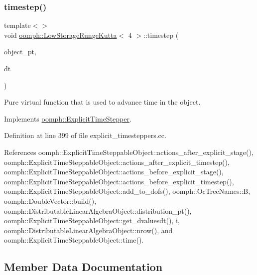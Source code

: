 \subsubsection{\texorpdfstring{timestep()}{timestep()}\hspace{0.1cm}{\footnotesize\ttfamily [2/2]}}
{\footnotesize\ttfamily template$<$$>$ \\
void \hyperlink{classoomph_1_1LowStorageRungeKutta}{oomph\+::\+Low\+Storage\+Runge\+Kutta}$<$ 4 $>$\+::timestep (\begin{DoxyParamCaption}\item[{\hyperlink{classoomph_1_1ExplicitTimeSteppableObject}{Explicit\+Time\+Steppable\+Object} $\ast$const \&}]{object\+\_\+pt,  }\item[{const double \&}]{dt }\end{DoxyParamCaption})\hspace{0.3cm}{\ttfamily [virtual]}}



Pure virtual function that is used to advance time in the object. 



Implements \hyperlink{classoomph_1_1ExplicitTimeStepper_ab43bbab17960d0f50b8842e996f5c765}{oomph\+::\+Explicit\+Time\+Stepper}.



Definition at line 399 of file explicit\+\_\+timesteppers.\+cc.



References oomph\+::\+Explicit\+Time\+Steppable\+Object\+::actions\+\_\+after\+\_\+explicit\+\_\+stage(), oomph\+::\+Explicit\+Time\+Steppable\+Object\+::actions\+\_\+after\+\_\+explicit\+\_\+timestep(), oomph\+::\+Explicit\+Time\+Steppable\+Object\+::actions\+\_\+before\+\_\+explicit\+\_\+stage(), oomph\+::\+Explicit\+Time\+Steppable\+Object\+::actions\+\_\+before\+\_\+explicit\+\_\+timestep(), oomph\+::\+Explicit\+Time\+Steppable\+Object\+::add\+\_\+to\+\_\+dofs(), oomph\+::\+Oc\+Tree\+Names\+::B, oomph\+::\+Double\+Vector\+::build(), oomph\+::\+Distributable\+Linear\+Algebra\+Object\+::distribution\+\_\+pt(), oomph\+::\+Explicit\+Time\+Steppable\+Object\+::get\+\_\+dvaluesdt(), i, oomph\+::\+Distributable\+Linear\+Algebra\+Object\+::nrow(), and oomph\+::\+Explicit\+Time\+Steppable\+Object\+::time().



\subsection{Member Data Documentation}
\mbox{\label{classoomph_1_1LowStorageRungeKutta_a80a97c2c9660cefbe4d7cf515f768386}} 
